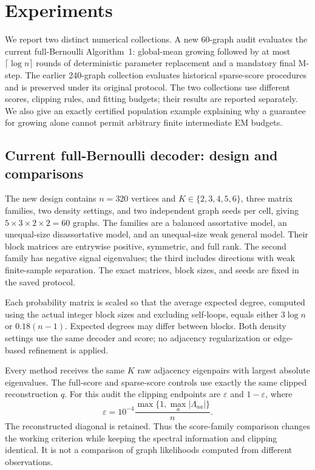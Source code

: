 \section{Experiments}
\label{sec:experiments}
We report two distinct numerical collections. A new 60-graph audit evaluates
the current full-Bernoulli Algorithm~1: global-mean growing followed by
at most $\lceil\log n\rceil$ rounds of deterministic parameter replacement
and a mandatory final M-step. The earlier 240-graph collection evaluates
historical sparse-score procedures and is preserved under its original
protocol. The two collections use different scores, clipping rules, and
fitting budgets; their results are reported separately. We also give an
exactly certified population example explaining why a guarantee for growing
alone cannot permit arbitrary finite intermediate EM budgets.

\subsection{Current full-Bernoulli decoder: design and comparisons}
The new design contains $n=320$ vertices and
$K\in\{2,3,4,5,6\}$, three matrix families, two density settings, and two
independent graph seeds per cell, giving $5\times3\times2\times2=60$ graphs.
The families are a balanced assortative model, an unequal-size
disassortative model, and an unequal-size weak general model. Their block
matrices are entrywise positive, symmetric, and full rank. The second family
has negative signal eigenvalues; the third includes directions with weak
finite-sample separation. The exact matrices, block sizes, and seeds are
fixed in the saved protocol.

Each probability matrix is scaled so that the average expected degree,
computed using the actual integer block sizes and excluding self-loops,
equals either $3\log n$ or $0.18(n-1)$. Expected degrees may differ between
blocks. Both density settings use the same decoder and score; no adjacency
regularization or edge-based refinement is applied.

Every method receives the same $K$ raw adjacency eigenpairs with largest
absolute eigenvalues. The full-score and sparse-score controls use exactly
the same clipped reconstruction $q$. For this audit the clipping endpoints
are $\varepsilon$ and $1-\varepsilon$, where
\[
 \varepsilon=10^{-4}\frac{\max\{1,\max_a|\Lambda_{aa}|\}}n.
\]
The reconstructed diagonal is retained. Thus the score-family comparison
changes the working criterion while keeping the spectral information and
clipping identical. It is not a comparison of graph likelihoods computed
from different observations.

